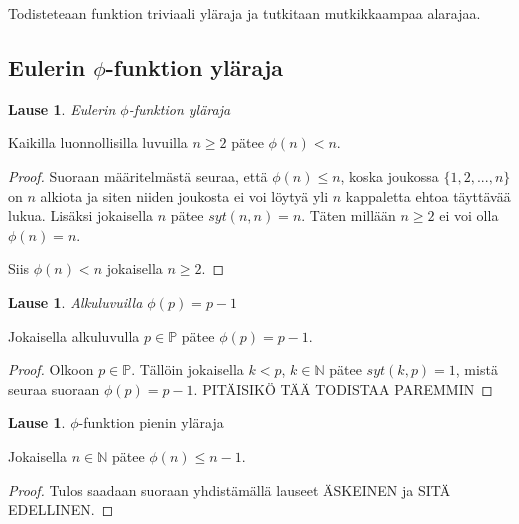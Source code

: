 \documentclass{article}
\theoremstyle{definition}
\newtheorem{lause}[subsection]{Lause}
\begin{document}
Todisteteaan funktion triviaali yläraja ja tutkitaan mutkikkaampaa alarajaa.

\subsection{Eulerin $\phi$-funktion yläraja}

\begin{lause}{\emph{Eulerin $\phi$-funktion yläraja}}

Kaikilla luonnollisilla luvuilla $n \geq 2$ pätee $\phi(n) < n$.

\begin{proof}

Suoraan määritelmästä seuraa, että $\phi(n) \leq n$, koska joukossa $\{1,2,...,n\}$ on $n$ alkiota ja siten niiden joukosta ei voi löytyä yli $n$ kappaletta ehtoa täyttävää lukua. Lisäksi jokaisella $n$ pätee $syt(n,n) = n$. Täten millään $n \geq 2$ ei voi olla $\phi(n) = n$.

Siis $\phi(n) < n$ jokaisella $n \geq 2$.

\end{proof}

\end{lause}

\begin{lause}{\emph{Alkuluvuilla $\phi(p)=p-1$}}

Jokaisella alkuluvulla $p\in\mathbb{P}$ pätee $\phi(p)=p-1$.

\begin{proof}

Olkoon $p\in\mathbb{P}$. Tällöin jokaisella $k<p$, $k\in\mathbb{N}$ pätee $syt(k, p)=1$, mistä seuraa suoraan $\phi(p)=p-1$. PITÄISIKÖ TÄÄ TODISTAA PAREMMIN

\end{proof}

\end{lause}

\begin{lause}{$\phi$-funktion pienin yläraja}

Jokaisella $n \in \mathbb{N}$ pätee $\phi(n)\leq {n-1}$.

\begin{proof}

Tulos saadaan suoraan yhdistämällä lauseet ÄSKEINEN ja SITÄ EDELLINEN.

\end{proof}

\end{lause}
\end{document}
